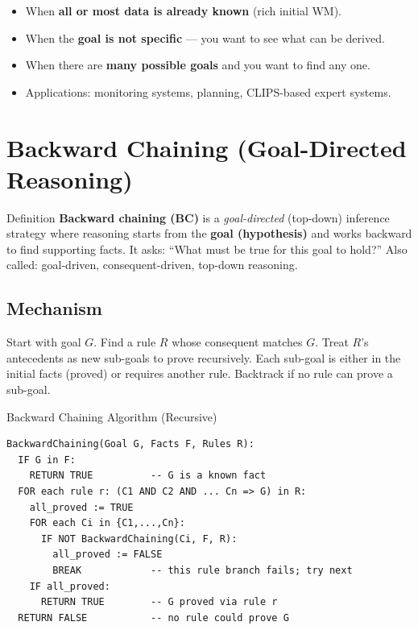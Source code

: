 \documentclass[12pt,a4paper]{article}
\begin{document}
\begin{itemize}
  \item When \textbf{all or most data is already known} (rich initial WM).
  \item When the \textbf{goal is not specific} --- you want to see what can be derived.
  \item When there are \textbf{many possible goals} and you want to find any one.
  \item Applications: monitoring systems, planning, CLIPS-based expert systems.
\end{itemize}

\section{Backward Chaining (Goal-Directed Reasoning)}

\begin{defbox}{Definition}
\textbf{Backward chaining (BC)} is a \emph{goal-directed} (top-down) inference strategy
where reasoning starts from the \textbf{goal (hypothesis)} and works backward to find
supporting facts. It asks: ``What must be true for this goal to hold?''
Also called: goal-driven, consequent-driven, top-down reasoning.
\end{defbox}

\subsection{Mechanism}

Start with goal $G$.
Find a rule $R$ whose consequent matches $G$.
Treat $R$'s antecedents as new sub-goals to prove recursively.
Each sub-goal is either in the initial facts (proved) or requires another rule.
Backtrack if no rule can prove a sub-goal.

\begin{algobox}{Backward Chaining Algorithm (Recursive)}
\begin{verbatim}
BackwardChaining(Goal G, Facts F, Rules R):
  IF G in F:
    RETURN TRUE          -- G is a known fact
  FOR each rule r: (C1 AND C2 AND ... Cn => G) in R:
    all_proved := TRUE
    FOR each Ci in {C1,...,Cn}:
      IF NOT BackwardChaining(Ci, F, R):
        all_proved := FALSE
        BREAK            -- this rule branch fails; try next
    IF all_proved:
      RETURN TRUE        -- G proved via rule r
  RETURN FALSE           -- no rule could prove G
\end{verbatim}
\end{algobox}
\end{document}
